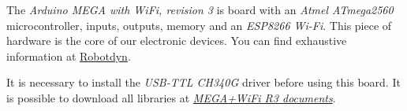 The \textit{Arduino MEGA with WiFi, revision 3} is board with an \textit{Atmel ATmega2560} microcontroller, inputs, outputs, memory and an \textit{ESP8266 Wi-Fi}. This piece of hardware is the core of our electronic devices.
You can find exhaustive information at \href{https://robotdyn.com/mega-wifi-r3-atmega2560-esp8266-flash-32mb-usb-ttl-ch340g-micro-usb.html}{Robotdyn}.

It is necessary to install the \textit{USB-TTL CH340G} driver before using this board. It is possible to download all libraries at \href{https://robotdyn.com/catalog/arduino/mega-wifi-r3-atmega2560-esp8266-flash-32mb-usb-ttl-ch340g-micro-usb.html#custom-2}{\textit{MEGA+WiFi R3 documents}}.
